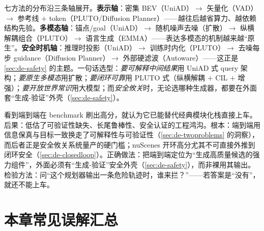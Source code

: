 \begin{insight}[一张表里藏着三条可读的轴]
七方法的分布沿三条轴展开。\textbf{表示轴}：密集 BEV（UniAD）$\to$ 矢量化（VAD）$\to$ 参考线 $+$ token（PLUTO/Diffusion Planner）——越往后越省算力、越依赖结构先验。\textbf{多模态轴}：锚点/goal（UniAD）$\to$ 随机噪声去噪（扩散）$\to$ 纵横解耦组合（PLUTO）$\to$ 语言生成（EMMA）——表达多模态的机制越来越“原生”。\textbf{安全时机轴}：推理时投影（UniAD）$\to$ 训练时内化（PLUTO）$\to$ 去噪每步 guidance（Diffusion Planner）$\to$ 外部硬滤波（Autoware）——这正是 \cref{sec:de-safety} 的主题。一句话选型：\emph{要可解释中间结果}用 UniAD 式 query 架构；\emph{要原生多模态}用扩散；\emph{要闭环可靠}用 PLUTO 式（纵横解耦 $+$ CIL $+$ 增强）；\emph{要开放世界常识}用大模型；而\emph{安全攸关}时，无论选哪种生成器，都要在外面套“生成-验证”外壳（\cref{sec:de-safety}）。
\end{insight}

\begin{pitfall}
看到端到端在 benchmark 刷出高分，就认为它已能替代经典模块化栈直接上车。后果：低估了可验证性缺失、长尾鲁棒性、安全认证的工程鸿沟。根本：端到端用信息保真与目标一致换走了可解释性与可验证性（\cref{sec:de-twoproblems} 的洞察），而后者正是安全攸关系统量产的硬门槛；nuScenes 开环高分尤其不可直接外推到闭环安全（\cref{sec:de-closedloop}）。正确做法：把端到端定位为“生成高质量候选的强力组件”，外面必须有“生成-验证”安全外壳（\cref{sec:de-safety}），而非裸用其输出。检验方法：问“这个规划器输出一条危险轨迹时，谁来拦？”——若答案是“没有”，就还不能上车。
\end{pitfall}

\section*{本章常见误解汇总}

